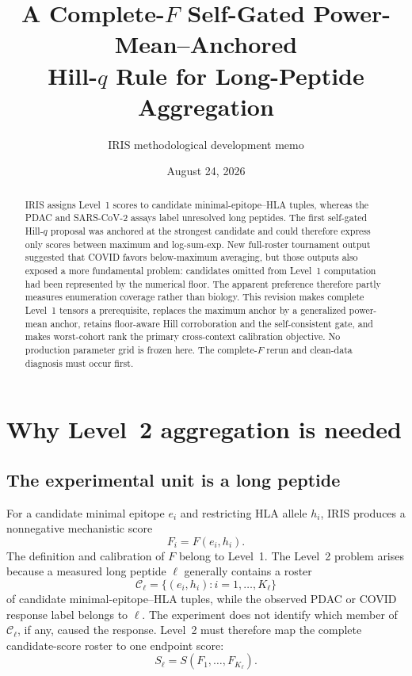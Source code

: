 \documentclass[11pt]{article}
\title{\textbf{A Complete-$F$ Self-Gated Power-Mean--Anchored\\Hill-$q$ Rule for Long-Peptide Aggregation}}
\author{IRIS methodological development memo}
\date{August 24, 2026}
\begin{document}
\maketitle

\begin{abstract}
IRIS assigns Level~1 scores to candidate minimal-epitope--HLA tuples, whereas
the PDAC and SARS-CoV-2 assays label unresolved long peptides. The first
self-gated Hill-$q$ proposal was anchored at the strongest candidate and could
therefore express only scores between maximum and log-sum-exp. New full-roster
tournament output suggested that COVID favors below-maximum averaging, but
those outputs also exposed a more fundamental problem: candidates omitted from
Level~1 computation had been represented by the numerical floor. The apparent
preference therefore partly measures enumeration coverage rather than biology.
This revision makes complete Level~1 tensors a prerequisite, replaces the
maximum anchor by a generalized power-mean anchor, retains floor-aware Hill
corroboration and the self-consistent gate, and makes worst-cohort rank the
primary cross-context calibration objective. No production parameter grid is
frozen here. The complete-$F$ rerun and clean-data diagnosis must occur first.
\end{abstract}

\section{Why Level~2 aggregation is needed}

\subsection{The experimental unit is a long peptide}

For a candidate minimal epitope $e_i$ and restricting HLA allele $h_i$, IRIS
produces a nonnegative mechanistic score
\begin{equation}
F_i=F(e_i,h_i).
\end{equation}
The definition and calibration of $F$ belong to Level~1. The Level~2 problem
arises because a measured long peptide $\ell$ generally contains a roster
\begin{equation}
\mathcal C_\ell=\{(e_i,h_i):i=1,\ldots,K_\ell\}
\end{equation}
of candidate minimal-epitope--HLA tuples, while the observed PDAC or COVID
response label belongs to $\ell$. The experiment does not identify which
member of $\mathcal C_\ell$, if any, caused the response. Level~2 must
therefore map the complete candidate-score roster to one endpoint score:
\begin{equation}
S_\ell=S(F_1,\ldots,F_{K_\ell}).
\end{equation}
\end{document}
